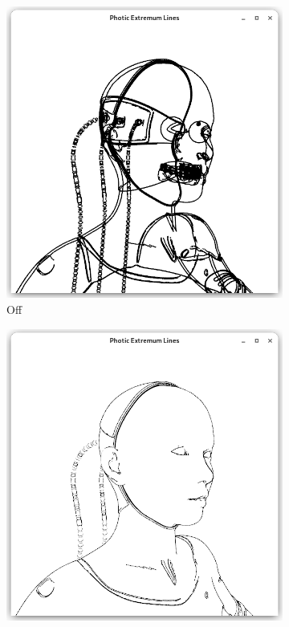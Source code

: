 \documentclass[9pt,fleqn,twoside,twocolumn]{stdglobal}
\begin{document}
    \begin{figure}[h]
      \centering
      \begin{subfigure}[b]{0.49\linewidth}
        \centering
        \includegraphics[width=\textwidth,trim={15px 15 15 50},clip]{images/cyborg-contour-pel-hidden-shader.png}
        \caption{Off}
      \end{subfigure}
      \begin{subfigure}[b]{0.49\linewidth}
        \centering
        \includegraphics[width=\textwidth,trim={15px 15 15 50},clip]{images/cyborg-contour-pel-shader.png}

\end{subfigure}
\end{figure}
\end{document}
